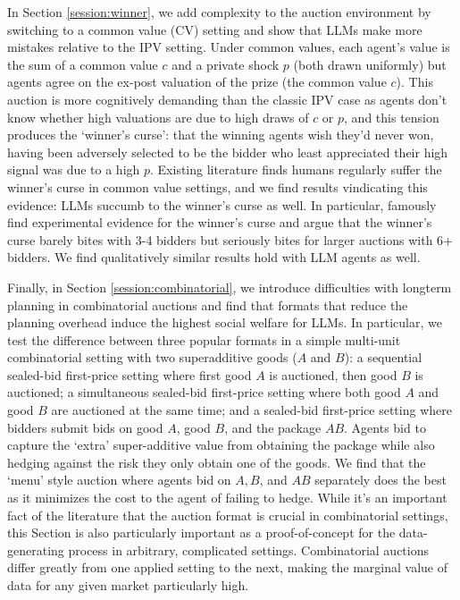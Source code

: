 \documentclass{article} %
\begin{document}
In Section \ref{session:winner}, we add complexity to the auction environment by switching to a common value (CV) setting and show that LLMs make more mistakes relative to the IPV setting. 
Under common values, each agent's value is the sum of a common value $c$ and a private shock $p$ (both drawn uniformly) but agents agree on the ex-post valuation of the prize (the common value $c$). 
This auction is more cognitively demanding than the classic IPV case as agents don't know whether high valuations are due to high draws of $c$ or $p$, and this tension produces the `winner's curse': that the winning agents wish they'd never won, having been adversely selected to be the bidder who least appreciated their high signal was due to a high $p$. 
Existing literature finds humans regularly suffer the winner's curse in common value settings, and we find results vindicating this evidence: LLMs succumb to the winner’s curse as well. 
In particular, \citet{kagel1986winner} famously find experimental evidence for the winner’s curse and argue that the winner’s curse barely bites with 3-4 bidders but seriously bites for larger auctions with 6+ bidders. 
We find qualitatively similar results hold with LLM agents as well.

Finally, in Section \ref{session:combinatorial}, we introduce difficulties with longterm planning in combinatorial auctions and find that formats that reduce the planning overhead induce the highest social welfare for LLMs. 
In particular, we test the difference between three popular formats in a simple multi-unit combinatorial setting with two superadditive goods ($A$ and $B$): a sequential sealed-bid first-price setting where first good $A$ is auctioned, then good $B$ is auctioned; a simultaneous sealed-bid first-price setting where both good $A$ and good $B$ are auctioned at the same time; and a sealed-bid first-price setting where bidders submit bids on good $A$, good $B$, and the package $AB$. 
Agents bid to capture the `extra' super-additive value from obtaining the package while also hedging against the risk they only obtain one of the goods. 
We find that the `menu' style auction where agents bid on $A, B$, and $AB$ separately does the best as it minimizes the cost to the agent of failing to hedge. 
While it's an important fact of the literature that the auction format is crucial in combinatorial settings, this Section is also particularly important as a proof-of-concept for the data-generating process in arbitrary, complicated settings. 
Combinatorial auctions differ greatly from one applied setting to the next, making the marginal value of data for any given market particularly high.
\end{document}
